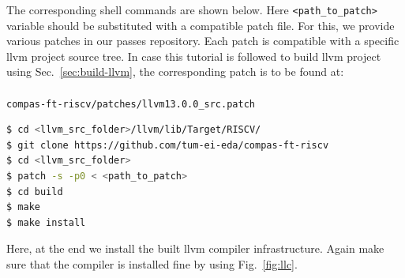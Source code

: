 The corresponding shell commands are shown below. Here \texttt{<path\_to\_patch>} variable should be substituted
with a compatible patch file. For this, we provide various patches in our passes repository.
Each patch is compatible with a specific llvm project source tree.
In case this tutorial is followed to build llvm project using Sec.~\ref{sec:build-llvm},
the corresponding patch is to be found at:\\\\
\texttt{compas-ft-riscv/patches/llvm13.0.0\_src.patch}

\begin{framed}
 \begin{lstlisting}[language=bash, basicstyle=\small\ttfamily]
$ cd <llvm_src_folder>/llvm/lib/Target/RISCV/
$ git clone https://github.com/tum-ei-eda/compas-ft-riscv
$ cd <llvm_src_folder>
$ patch -s -p0 < <path_to_patch>
$ cd build
$ make
$ make install
\end{lstlisting}
\end{framed}

Here, at the end we install the built llvm compiler infrastructure. Again make sure that the compiler is installed fine
by using Fig.~\ref{fig:llc}.
